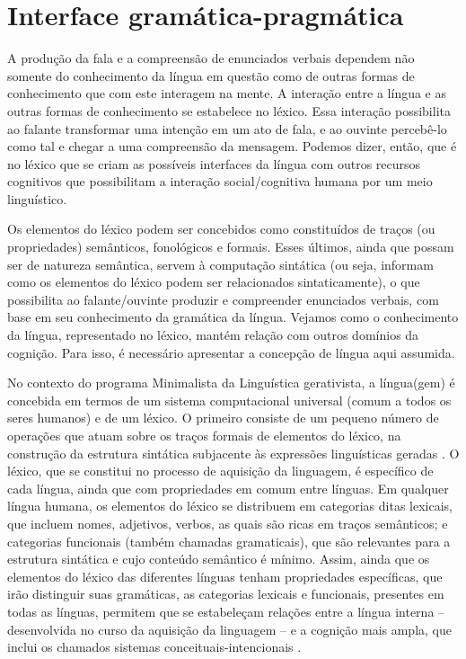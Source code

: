 \documentclass[output=paper,colorlinks,citecolor=brown,booklanguage=portuguese]{langscibook}
\begin{document}
\section{Interface gramática-pragmática }\label{sec:doiscap15}
A produção da fala e a compreensão de enunciados verbais dependem não somente do conhecimento da língua em questão como de outras formas de conhecimento que com este interagem na mente. A interação entre a língua e as outras formas de conhecimento se estabelece no léxico. Essa interação possibilita ao falante transformar uma intenção em um ato de fala, e ao ouvinte percebê-lo como tal e chegar a uma compreensão da mensagem. Podemos dizer, então, que é no léxico que se criam as possíveis interfaces da língua com outros recursos cognitivos que possibilitam a interação social/cognitiva humana por um meio linguístico. 

Os elementos do léxico podem ser concebidos como constituídos de traços (ou propriedades) semânticos, fonológicos e formais. Esses últimos, ainda que possam ser de natureza semântica, servem à computação sintática (ou seja, informam como os elementos do léxico podem ser relacionados sintaticamente), o que possibilita ao falante/ouvinte produzir e compreender enunciados verbais, com base em seu conhecimento da gramática da língua. Vejamos como o conhecimento da língua, representado no léxico, mantém relação com outros domínios da cognição. Para isso, é necessário apresentar a concepção de língua aqui assumida.

No contexto do programa Minimalista da Linguística gerativista, a língua(gem) é concebida em termos de um sistema computacional universal (comum a todos os seres humanos) e de um léxico. O primeiro consiste de um pequeno número de operações que atuam sobre os traços formais de elementos do léxico, na construção da estrutura sintática subjacente às expressões linguísticas geradas \citep{Chomsky1995}. O léxico, que se constitui no processo de aquisição da linguagem, é específico de cada língua, ainda que com propriedades em comum entre línguas. Em qualquer língua humana, os elementos do léxico se distribuem em categorias ditas lexicais, que incluem nomes, adjetivos, verbos, as quais são ricas em traços semânticos; e categorias funcionais (também chamadas gramaticais), que são relevantes para a estrutura sintática e cujo conteúdo semântico é mínimo. Assim, ainda que os elementos do léxico das diferentes línguas tenham propriedades específicas, que irão distinguir suas gramáticas, as categorias lexicais e funcionais, presentes em todas as línguas, permitem que se estabeleçam relações entre a língua interna – desenvolvida no curso da aquisição da linguagem – e a cognição mais ampla, que inclui os chamados sistemas conceituais-intencionais \citep{Chomsky1995}. 
\end{document}
